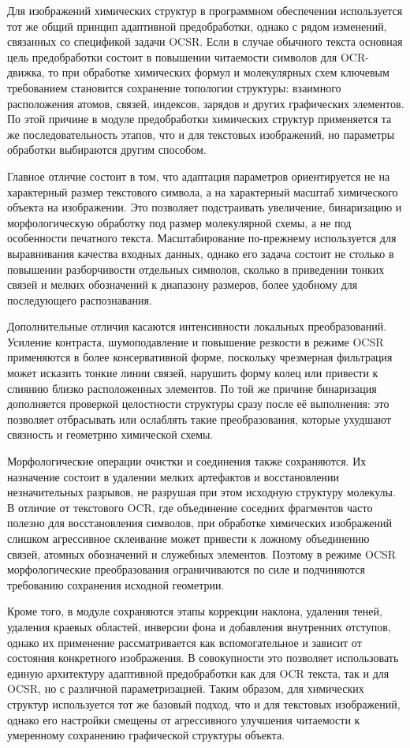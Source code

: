 Для изображений химических структур в программном обеспечении используется тот же общий принцип адаптивной предобработки, однако с рядом изменений, связанных со спецификой задачи OCSR. Если в случае обычного текста основная цель предобработки состоит в повышении читаемости символов для OCR-движка, то при обработке химических формул и молекулярных схем ключевым требованием становится сохранение топологии структуры: взаимного расположения атомов, связей, индексов, зарядов и других графических элементов. По этой причине в модуле предобработки химических структур применяется та же последовательность этапов, что и для текстовых изображений, но параметры обработки выбираются другим способом.

Главное отличие состоит в том, что адаптация параметров ориентируется не на характерный размер текстового символа, а на характерный масштаб химического объекта на изображении. Это позволяет подстраивать увеличение, бинаризацию и морфологическую обработку под размер молекулярной схемы, а не под особенности печатного текста. Масштабирование по-прежнему используется для выравнивания качества входных данных, однако его задача состоит не столько в повышении разборчивости отдельных символов, сколько в приведении тонких связей и мелких обозначений к диапазону размеров, более удобному для последующего распознавания.

Дополнительные отличия касаются интенсивности локальных преобразований. Усиление контраста, шумоподавление и повышение резкости в режиме OCSR применяются в более консервативной форме, поскольку чрезмерная фильтрация может исказить тонкие линии связей, нарушить форму колец или привести к слиянию близко расположенных элементов. По той же причине бинаризация дополняется проверкой целостности структуры сразу после её выполнения: это позволяет отбрасывать или ослаблять такие преобразования, которые ухудшают связность и геометрию химической схемы.

Морфологические операции очистки и соединения также сохраняются. Их назначение состоит в удалении мелких артефактов и восстановлении незначительных разрывов, не разрушая при этом исходную структуру молекулы. В отличие от текстового OCR, где объединение соседних фрагментов часто полезно для восстановления символов, при обработке химических изображений слишком агрессивное склеивание может привести к ложному объединению связей, атомных обозначений и служебных элементов. Поэтому в режиме OCSR морфологические преобразования ограничиваются по силе и подчиняются требованию сохранения исходной геометрии.

Кроме того, в модуле сохраняются этапы коррекции наклона, удаления теней, удаления краевых областей, инверсии фона и добавления внутренних отступов, однако их применение рассматривается как вспомогательное и зависит от состояния конкретного изображения. В совокупности это позволяет использовать единую архитектуру адаптивной предобработки как для OCR текста, так и для OCSR, но с различной параметризацией. Таким образом, для химических структур используется тот же базовый подход, что и для текстовых изображений, однако его настройки смещены от агрессивного улучшения читаемости к умеренному сохранению графической структуры объекта.